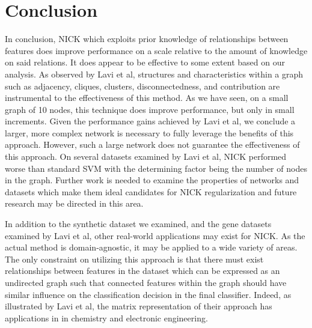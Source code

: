 \section{Conclusion}
In conclusion, NICK which exploits prior knowledge of relationships between features does improve performance on a scale relative to the amount of knowledge on said relations. It does appear to be effective to some extent based on our analysis. As observed by Lavi et al, structures and characteristics within a graph such as adjacency, cliques, clusters, disconnectedness, and contribution are instrumental to the effectiveness of this method. As we have seen, on a small graph of 10 nodes, this technique does improve performance, but only in small increments.  Given the performance gains achieved by Lavi et al, we conclude a larger, more complex network is necessary to fully leverage the benefits of this approach.  However, such a large network does not guarantee the effectiveness of this approach. On several datasets examined by Lavi et al, NICK performed worse than standard SVM with the determining factor being the number of nodes in the graph.  Further work is needed to examine the properties of networks and datasets which make them ideal candidates for NICK regularization and future research may be directed in this area.
	
In addition to the synthetic dataset we examined, and the gene datasets examined by Lavi et al, other real-world applications may exist for NICK. As the actual method is domain-agnostic, it may be applied to a wide variety of areas.  The only constraint on utilizing this approach is that there must exist relationships between features in the dataset which can be expressed as an undirected graph such that connected features within the graph should have similar influence on the classification decision in the final classifier.  Indeed, as illustrated by Lavi et al, the matrix representation of their approach has applications in in chemistry and electronic engineering.  